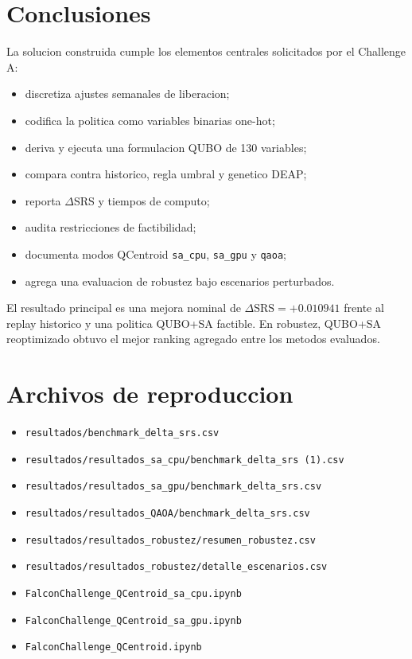 \documentclass[11pt,letterpaper]{article}
\begin{document}
\section{Conclusiones}

La solucion construida cumple los elementos centrales solicitados por el
Challenge A:

\begin{itemize}
  \item discretiza ajustes semanales de liberacion;
  \item codifica la politica como variables binarias one-hot;
  \item deriva y ejecuta una formulacion QUBO de 130 variables;
  \item compara contra historico, regla umbral y genetico DEAP;
  \item reporta $\Delta$SRS y tiempos de computo;
  \item audita restricciones de factibilidad;
  \item documenta modos QCentroid \texttt{sa\_cpu}, \texttt{sa\_gpu} y
  \texttt{qaoa};
  \item agrega una evaluacion de robustez bajo escenarios perturbados.
\end{itemize}

El resultado principal es una mejora nominal de
$\Delta\mathrm{SRS}=+0.010941$ frente al replay historico y una politica QUBO+SA
factible. En robustez, QUBO+SA reoptimizado obtuvo el mejor ranking agregado
entre los metodos evaluados.

\section*{Archivos de reproduccion}

\begin{itemize}
  \item \texttt{resultados/benchmark\_delta\_srs.csv}
  \item \texttt{resultados/resultados\_sa\_cpu/benchmark\_delta\_srs (1).csv}
  \item \texttt{resultados/resultados\_sa\_gpu/benchmark\_delta\_srs.csv}
  \item \texttt{resultados/resultados\_QAOA/benchmark\_delta\_srs.csv}
  \item \texttt{resultados/resultados\_robustez/resumen\_robustez.csv}
  \item \texttt{resultados/resultados\_robustez/detalle\_escenarios.csv}
  \item \texttt{FalconChallenge\_QCentroid\_sa\_cpu.ipynb}
  \item \texttt{FalconChallenge\_QCentroid\_sa\_gpu.ipynb}
  \item \texttt{FalconChallenge\_QCentroid.ipynb}
\end{itemize}
\end{document}
